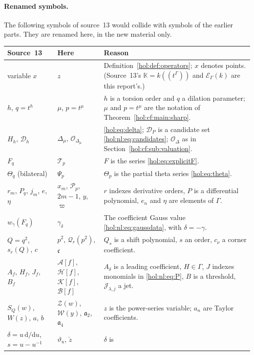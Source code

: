 \documentclass[11pt]{article}
\numberwithin{equation}{section}
\theoremstyle{definition}
\theoremstyle{remark}
\newcommand{\KK}{\mathbb K}
\newcommand{\EK}{\mathcal E_\Gamma(k)}
\newcommand{\jet}[2]{\mathcal J_{#1,#2}}
\begin{document}
\paragraph{Renamed symbols.}
The following symbols of source~13 would collide with symbols of the earlier
parts. They are renamed here, in the new material only.
{\small
\begin{longtable}{@{}>{\raggedright\arraybackslash}p{}
>{\raggedright\arraybackslash}p{}
>{\raggedright\arraybackslash}p{}@{}}
\toprule
Source~13 & Here & Reason\\
\midrule
\endhead
variable $x$ & $z$ & Definition~\ref{hol:def:operators}; $x$ denotes
points. (Source~13's $\KK=k((t^\Gamma))$ and $\EK$ are this report's.)\\
$h$, $q=t^h$ & $\mu$, $p=t^\mu$ & $h$ is a torsion order and $q$ a dilation
parameter; $\mu$ and $p=t^\mu$ are the notation of
Theorem~\ref{hol:cf:main:sharp}.\\
$H_h$, $\mathcal D_h$ & $\Delta_\mu$, $\mathcal O_{\Delta_\mu}$ &
\eqref{hol:eq:delta}; $\mathcal D_P$ is a candidate set
\eqref{hol:nl:eq:candidates}; $\mathcal O_\Delta$ as in
Section~\ref{hol:cf:sub:valuation}.\\
$F_q$ & $\mathcal T_p$ & $F$ is the series \eqref{hol:eq:explicitF}.\\
$\Theta_q$ (bilateral) & $\Psi_p$ & $\Theta_p$ is the partial theta series
\eqref{hol:eq:theta}.\\
$r_m$, $P_q$, $j_m$, $e$, $\eta$ & $x_m$, $\mathcal P_p$, $2m-1$, $y$,
$\varpi$ & $r$ indexes derivative orders, $P$ is a differential polynomial,
$e_n$ and $\eta$ are elements of $\Gamma$.\\
$w_\gamma(F_q)$ & $\gamma_\delta$ & The coefficient Gauss value
\eqref{hol:nl:eq:gaussdata}, with $\delta=-\gamma$.\\
$Q=q^2$, $s_r(Q)$, $c$ & $p^2$, $\mathcal Q_r(p^2)$, $\mathfrak c$ & $Q_s$ is
a shift polynomial, $s$ an order, $c_\nu$ a corner coefficient.\\
$A_f$, $H_f$, $J_f$, $B_f$ & $\mathcal A[f]$, $\mathcal H[f]$,
$\mathcal K[f]$, $\mathcal B[f]$ & $A_\delta$ is a leading coefficient,
$H\in\Gamma$, $J$ indexes monomials in \eqref{hol:nl:eq:P}, $B$ is a
threshold, $\jet\lambda j$ a jet.\\
$S_Q(w)$, $W(z)$, $a$, $b$ & $\mathcal Z(w)$, $\mathcal W(y)$,
$\mathfrak a_2$, $\mathfrak a_4$ & $z$ is the power-series variable; $a_n$
are Taylor coefficients.\\
$\delta=u\,\mathrm d/\mathrm d u$, $s=u-u^{-1}$ & $\vartheta_u$, $\check z$ & $\delta$ is

\end{longtable}}
\end{document}
